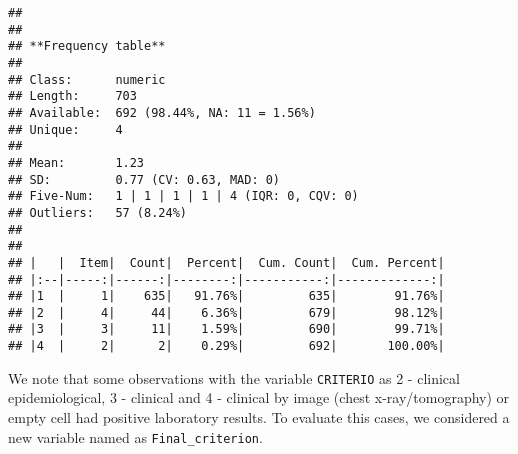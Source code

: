 \documentclass[
]{article}
\begin{document}
\begin{verbatim}
## 
## 
## **Frequency table**   
## 
## Class:      numeric  
## Length:     703  
## Available:  692 (98.44%, NA: 11 = 1.56%)  
## Unique:     4  
##   
## Mean:       1.23  
## SD:         0.77 (CV: 0.63, MAD: 0)  
## Five-Num:   1 | 1 | 1 | 1 | 4 (IQR: 0, CQV: 0)  
## Outliers:   57 (8.24%)
## 
## 
## |   |  Item|  Count|  Percent|  Cum. Count|  Cum. Percent|
## |:--|-----:|------:|--------:|-----------:|-------------:|
## |1  |     1|    635|   91.76%|         635|        91.76%|
## |2  |     4|     44|    6.36%|         679|        98.12%|
## |3  |     3|     11|    1.59%|         690|        99.71%|
## |4  |     2|      2|    0.29%|         692|       100.00%|
\end{verbatim}

We note that some observations with the variable \texttt{CRITERIO} as 2
- clinical epidemiological, 3 - clinical and 4 - clinical by image
(chest x-ray/tomography) or empty cell had positive laboratory results.
To evaluate this cases, we considered a new variable named as
\texttt{Final\_criterion}.
\end{document}
